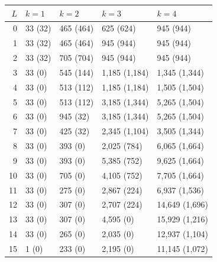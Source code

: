 \begin{tabular}{rllll}
\toprule
$L$ & $k=1$ & $k=2$ & $k=3$ & $k=4$\\
\midrule
0 & 33 (32) & 465 (464) & 625 (624) & 945 (944)\\
1 & 33 (32) & 465 (464) & 945 (944) & 945 (944)\\
2 & 33 (32) & 705 (704) & 945 (944) & 945 (944)\\
3 & 33 (0) & 545 (144) & 1{,}185 (1{,}184) & 1{,}345 (1{,}344)\\
4 & 33 (0) & 513 (112) & 1{,}185 (1{,}184) & 1{,}505 (1{,}504)\\
5 & 33 (0) & 513 (112) & 3{,}185 (1{,}344) & 5{,}265 (1{,}504)\\
6 & 33 (0) & 945 (32) & 3{,}185 (1{,}344) & 5{,}265 (1{,}504)\\
7 & 33 (0) & 425 (32) & 2{,}345 (1{,}104) & 3{,}505 (1{,}344)\\
8 & 33 (0) & 393 (0) & 2{,}025 (784) & 6{,}065 (1{,}664)\\
9 & 33 (0) & 393 (0) & 5{,}385 (752) & 9{,}625 (1{,}664)\\
10 & 33 (0) & 705 (0) & 4{,}105 (752) & 7{,}705 (1{,}664)\\
11 & 33 (0) & 275 (0) & 2{,}867 (224) & 6{,}937 (1{,}536)\\
12 & 33 (0) & 307 (0) & 2{,}707 (224) & 14{,}649 (1{,}696)\\
13 & 33 (0) & 307 (0) & 4{,}595 (0) & 15{,}929 (1{,}216)\\
14 & 33 (0) & 265 (0) & 2{,}035 (0) & 12{,}937 (1{,}104)\\
15 & 1 (0) & 233 (0) & 2{,}195 (0) & 11{,}145 (1{,}072)\\
\bottomrule
\end{tabular}
